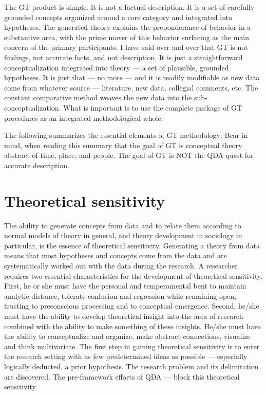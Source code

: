 The GT product is simple. 
It is not a factual description. 
It is a set of carefully grounded concepts organized around a core category and integrated into hypotheses. 
The generated theory explains the preponderance of behavior in a substantive area, with the prime mover of this behavior surfacing as the main concern of the primary participants. 
I have said over and over that GT is not findings, not accurate facts, and not description. 
It is just a straightforward conceptualization integrated into theory --- a set of plausible, grounded hypotheses. 
It is just that --- no more --- and it is readily modifiable as new data come from whatever source --- literature, new data, collegial comments, etc. 
The constant comparative method weaves the new data into the sub-conceptualization.
What is important is to use the complete package of GT procedures as an
integrated methodological whole.

The following summarizes the essential elements of GT methodology:
Bear in mind, when reading this summary that the goal of GT is conceptual theory abstract of time, place, and people. 
The goal of GT is NOT the QDA quest for accurate description.

\section*{Theoretical sensitivity}

The ability to generate concepts from data and to relate them according to normal models of theory in general, and theory development in sociology in particular, is the essence of theoretical sensitivity. 
Generating a theory from data means that most hypotheses and concepts come from the data and are systematically worked out with the data during the research. 
A researcher requires two essential characteristics for the development of theoretical sensitivity. 
First, he or she must have the personal and temperamental bent to maintain analytic distance, tolerate confusion and regression while remaining open, trusting to preconscious processing and to
conceptual emergence. 
Second, he/she must have the ability to develop theoretical insight into the area of research combined with the ability to make something of these insights. 
He/she must have the ability to conceptualize and organize, make abstract connections, visualize and think multivariate. 
The first step in gaining theoretical sensitivity is to enter the research setting with as few predetermined ideas as possible
--- especially logically deducted, a prior hypothesis. 
The research problem and its delimitation are discovered. 
The pre-framework efforts of QDA --- block this theoretical sensitivity.

